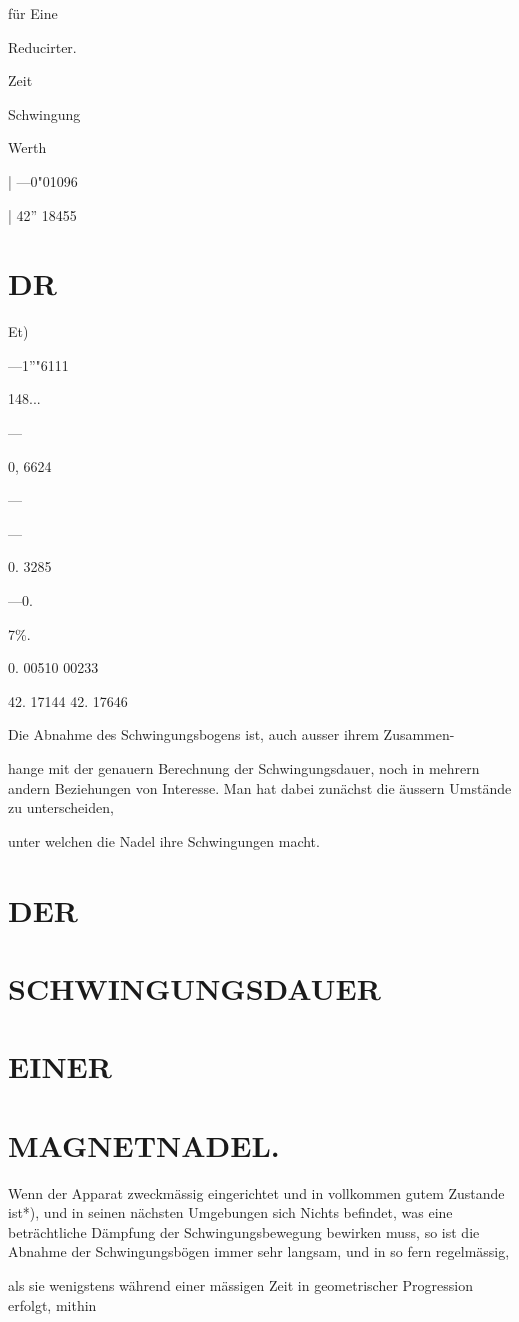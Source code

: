 \documentclass[12pt,a4paper]{article}
\begin{document}
für Eine

Reducirter.

Zeit

Schwingung

Werth

| —0"01096

| 42” 18455

\section*{DR}
Et)

—1”"6111

148...

—

0, 6624

—

—

0. 3285

—0.

7\%.

0. 00510 00233

42. 17144 42. 17646

Die Abnahme des Schwingungsbogens ist, auch ausser ihrem Zusammen-

hange mit der genauern Berechnung der Schwingungsdauer, noch in mehrern andern Beziehungen von Interesse. Man hat dabei zunächst die äussern Umstände zu unterscheiden,

unter welchen die Nadel ihre Schwingungen macht.

\section*{DER}
\section*{SCHWINGUNGSDAUER}
\section*{EINER}
\section*{MAGNETNADEL.}
Wenn der Apparat zweckmässig eingerichtet und in vollkommen gutem Zustande ist*), und in seinen nächsten Umgebungen sich Nichts befindet, was eine beträchtliche Dämpfung der Schwingungsbewegung bewirken muss, so ist die Abnahme der Schwingungsbögen immer sehr langsam, und in so fern regelmässig,

als sie wenigstens während einer mässigen Zeit in geometrischer Progression erfolgt, mithin
\end{document}
